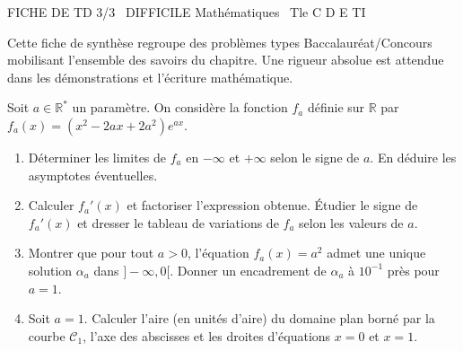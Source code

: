 \documentclass[11pt]{article}
\begin{document}
\begin{tcolorbox}[enhanced,colback=popink,colframe=popink,arc=10pt,boxrule=0pt,left=12pt,right=12pt,top=9pt,bottom=9pt]
{\color{white}\popxbold\small FICHE DE TD 3/3 \textbullet\ DIFFICILE \hfill Mathématiques \textbullet\ Tle C D E TI\par}
\end{tcolorbox}
\vspace{4pt}
Cette fiche de synthèse regroupe des problèmes types Baccalauréat/Concours mobilisant l'ensemble des savoirs du chapitre. Une rigueur absolue est attendue dans les démonstrations et l'écriture mathématique.

\begin{exercice}
Soit $a \in \mathbb{R}^*$ un paramètre. On considère la fonction $f_a$ définie sur $\mathbb{R}$ par $f_a(x) = (x^2 - 2ax + 2a^2)e^{ax}$.

\begin{enumerate}
    \item Déterminer les limites de $f_a$ en $-\infty$ et $+\infty$ selon le signe de $a$. En déduire les asymptotes éventuelles.
    \item Calculer $f_a'(x)$ et factoriser l'expression obtenue. Étudier le signe de $f_a'(x)$ et dresser le tableau de variations de $f_a$ selon les valeurs de $a$.
    \item Montrer que pour tout $a > 0$, l'équation $f_a(x) = a^2$ admet une unique solution $\alpha_a$ dans $]-\infty, 0[$. Donner un encadrement de $\alpha_a$ à $10^{-1}$ près pour $a=1$.
    \item Soit $a=1$. Calculer l'aire (en unités d'aire) du domaine plan borné par la courbe $\mathcal{C}_1$, l'axe des abscisses et les droites d'équations $x=0$ et $x=1$.
\end{enumerate}
\end{exercice}
\end{document}
